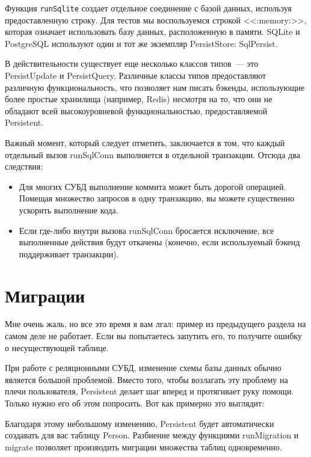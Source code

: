 Функция \lstinline'runSqlite' создает отдельное соединение с базой данных, используя предоставленную строку. Для тестов мы воспользуемся строкой <<:memory:>>, которая означает использовать базу данных, расположенную в памяти. SQLite и PostgreSQL используют один и тот же экземпляр PersistStore: SqlPersist.

\begin{remark}
В действительности существует еще несколько классов типов~--- это PersistUpdate и PersistQuery. Различные классы типов предоставляют различную функциональность, что позволяет нам писать бэкенды, использующие более простые хранилища (например, Redis) несмотря на то, что они не обладают всей высокоуровневой функциональностью, предоставляемой Persistent. 
\end{remark}

Важный момент, который следует отметить, заключается в том, что каждый отдельный вызов runSqlConn выполняется в отдельной транзакции. Отсюда два следствия:

\begin{itemize}
  \item Для многих СУБД выполнение коммита может быть дорогой операцией. Помещая множество запросов в одну транзакцию, вы можете существенно ускорить выполнение кода.
  \item Если где-либо внутри вызова runSqlConn бросается исключение, все выполненные действия будут откачены (конечно, если используемый бэкенд поддерживает транзакции).
\end{itemize}

\section{Миграции} %

Мне очень жаль, но все это время я вам лгал: пример из предыдущего раздела на самом деле не работает. Если вы попытаетесь запутить его, то получите ошибку о несуществующей таблице.

При работе с реляционными СУБД, изменение схемы базы данных обычно является большой проблемой. Вместо того, чтобы возлагать эту проблему на плечи пользователя, Persistent делает шаг вперед и протягивает руку помощи. Только нужно его об этом попросить. Вот как примерно это выглядит:


Благодаря этому небольшому изменению, Persistent будет автоматически создавать для вас таблицу Person. Разбиение между функциями runMigration и migrate позволяет производить миграции множества таблиц одновременно.

